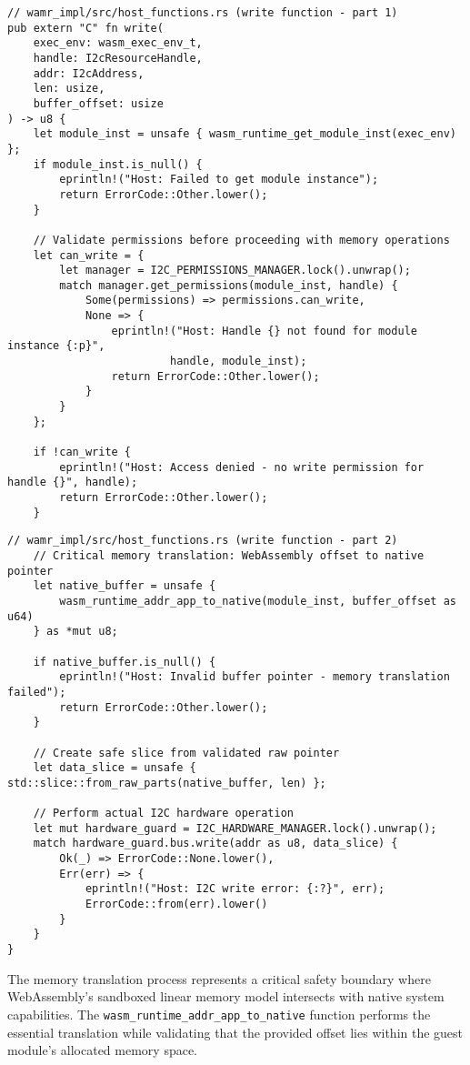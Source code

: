 \begin{verbatim}
// wamr_impl/src/host_functions.rs (write function - part 1)
pub extern "C" fn write(
    exec_env: wasm_exec_env_t,
    handle: I2cResourceHandle,
    addr: I2cAddress,
    len: usize,
    buffer_offset: usize
) -> u8 {
    let module_inst = unsafe { wasm_runtime_get_module_inst(exec_env) };
    if module_inst.is_null() {
        eprintln!("Host: Failed to get module instance");
        return ErrorCode::Other.lower();
    }

    // Validate permissions before proceeding with memory operations
    let can_write = {
        let manager = I2C_PERMISSIONS_MANAGER.lock().unwrap();
        match manager.get_permissions(module_inst, handle) {
            Some(permissions) => permissions.can_write,
            None => {
                eprintln!("Host: Handle {} not found for module instance {:p}", 
                         handle, module_inst);
                return ErrorCode::Other.lower();
            }
        }
    };

    if !can_write {
        eprintln!("Host: Access denied - no write permission for handle {}", handle);
        return ErrorCode::Other.lower();
    }
\end{verbatim}

\begin{verbatim}
// wamr_impl/src/host_functions.rs (write function - part 2)
    // Critical memory translation: WebAssembly offset to native pointer
    let native_buffer = unsafe {
        wasm_runtime_addr_app_to_native(module_inst, buffer_offset as u64)
    } as *mut u8;
    
    if native_buffer.is_null() {
        eprintln!("Host: Invalid buffer pointer - memory translation failed");
        return ErrorCode::Other.lower();
    }

    // Create safe slice from validated raw pointer
    let data_slice = unsafe { std::slice::from_raw_parts(native_buffer, len) };
    
    // Perform actual I2C hardware operation
    let mut hardware_guard = I2C_HARDWARE_MANAGER.lock().unwrap();
    match hardware_guard.bus.write(addr as u8, data_slice) {
        Ok(_) => ErrorCode::None.lower(),
        Err(err) => {
            eprintln!("Host: I2C write error: {:?}", err);
            ErrorCode::from(err).lower()
        }
    }
}
\end{verbatim}

The memory translation process represents a critical safety boundary where WebAssembly's sandboxed linear memory model intersects with native system capabilities. The \texttt{wasm\_runtime\_addr\_app\_to\_native} function performs the essential translation while validating that the provided offset lies within the guest module's allocated memory space.

